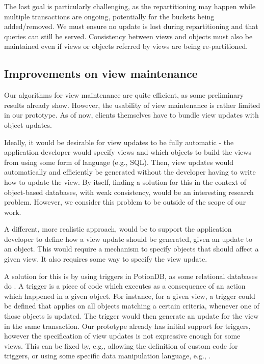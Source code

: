 The last goal is particularly challenging, as the repartitioning may happen while multiple transactions are ongoing, potentially for the buckets being added/removed.
We must ensure no update is lost during repartitioning and that queries can still be served.
Consistency between views and objects must also be maintained even if views or objects referred by views are being re-partitioned.

\subsection{Improvements on view maintenance}


Our algorithms for view maintenance are quite efficient, as some preliminary results already show.
However, the usability of view maintenance is rather limited in our prototype.
As of now, clients themselves have to bundle view updates with object updates.

Ideally, it would be desirable for view updates to be fully automatic - the application developer would specify views and which objects to build the views from using some form of language (e.g., SQL).
Then, view updates would automatically and efficiently be generated without the developer having to write how to update the view.
By itself, finding a solution for this in the context of object-based databases, with weak consistency, would be an interesting research problem.
However, we consider this problem to be outside of the scope of our work.

A different, more realistic approach, would be to support the application developer to define how a view update should be generated, given an update to an object.
This would require a mechanism to specify objects that should affect a given view.
It also requires some way to specify the view update.

A solution for this is by using triggers in PotionDB, as some relational databases do \cite{???}.
A trigger is a piece of code which executes as a consequence of an action which happened in a given object.
For instance, for a given view, a trigger could be defined that applies on all objects matching a certain criteria, whenever one of those objects is updated.
The trigger would then generate an update for the view in the same transaction.
Our prototype already has initial support for triggers, however the specification of view updates is not expressive enough for some views.
This can be fixed by, e.g., allowing the definition of custom code for triggers, or using some specific data manipulation language, e.g., \cite{???}.

